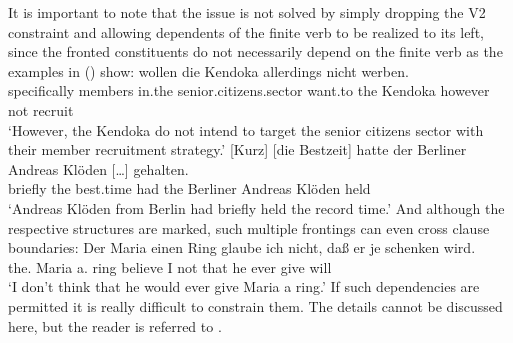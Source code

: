 It is important to note that the issue is not solved by simply dropping the V2 constraint and
allowing dependents of the finite verb to be realized to its left, since the fronted constituents do
not necessarily depend on the finite verb as the examples in () show:
\eal
\ex
\label{ex-mehrfach-vf-adv-acc}
\gll [Gezielt] [Mitglieder] [im     Seniorenbereich]       wollen  die Kendoka allerdings nicht werben.\footnotemark\\
    \spacebr{}specifically \spacebr{}members     \spacebr{}in.the senior.citizens.sector want.to the Kendoka however    not   recruit\\
\glt `However, the Kendoka do not intend to target the senior citizens sector with their member recruitment strategy.'%
\label{bsp-gezielt-mitglieder}
\ex 
\gll {}[Kurz] [die Bestzeit] hatte der Berliner Andreas Klöden [\ldots] gehalten.\footnotemark\\
	 \spacebr{}briefly \spacebr{}the best.time had the Berliner Andreas Klöden {} held\\
\label{bsp-kurz-die-bestzeit}     
\glt `Andreas Klöden from Berlin had briefly held the record time.'
\zl
And although the respective structures are marked, such multiple frontings can even cross clause boundaries:
\ea 
\gll Der        Maria einen    Ring glaube  ich nicht, daß  er je   schenken wird.\footnotemark\\
     the.\dat{} Maria a.\acc{} ring believe I   not    that he ever give     will\\
\glt `I don't think that he would ever give Maria a ring.'
\z
If such dependencies are permitted it is really difficult to constrain them. The details cannot be
discussed here, but the reader is referred to .

